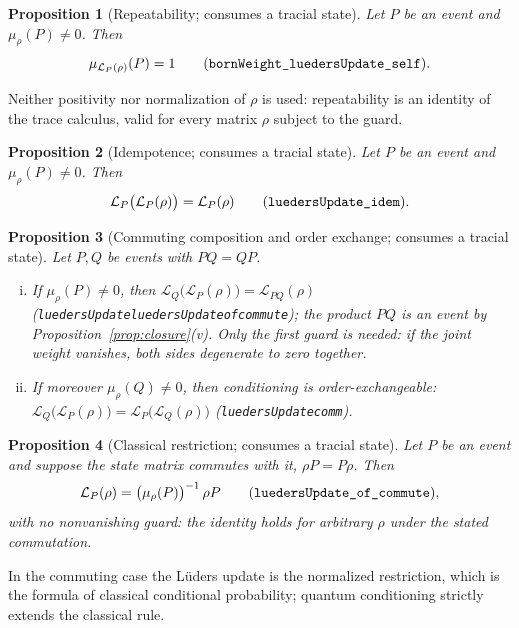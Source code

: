 \documentclass[11pt]{article}
\renewcommand{\_}{\textunderscore\allowbreak}
\newtheorem{proposition}{Proposition}
\theoremstyle{remark}
\newcommand{\lued}{\mathcal L}
\begin{document}
\begin{proposition}[Repeatability; consumes a tracial state]
\label{prop:repeat}
Let $P$ be an event and $\mu_\rho(P) \neq 0$. Then
\[
\mu_{\lued_P(\rho)}(P) = 1
\qquad (\texttt{bornWeight\_luedersUpdate\_self}).
\]
\end{proposition}

Neither positivity nor normalization of $\rho$ is used: repeatability is an identity of the trace calculus, valid for every matrix $\rho$ subject to the guard.

\begin{proposition}[Idempotence; consumes a tracial state]
\label{prop:idem}
Let $P$ be an event and $\mu_\rho(P) \neq 0$. Then
\[
\lued_P\bigl(\lued_P(\rho)\bigr) = \lued_P(\rho)
\qquad (\texttt{luedersUpdate\_idem}).
\]
\end{proposition}

\begin{proposition}[Commuting composition and order exchange; consumes a tracial state]
\label{prop:compose}
Let $P, Q$ be events with $PQ = QP$.
\begin{enumerate}[(i)]
\item If $\mu_\rho(P) \neq 0$, then $\lued_Q\bigl(\lued_P(\rho)\bigr) = \lued_{PQ}(\rho)$ (\texttt{luedersUpdate\_luedersUpdate\_of\_commute}); the product $PQ$ is an event by Proposition~\ref{prop:closure}(v). Only the first guard is needed: if the joint weight vanishes, both sides degenerate to zero together.
\item If moreover $\mu_\rho(Q) \neq 0$, then conditioning is order-exchangeable: $\lued_Q\bigl(\lued_P(\rho)\bigr) = \lued_P\bigl(\lued_Q(\rho)\bigr)$ (\texttt{luedersUpdate\_comm}).
\end{enumerate}
\end{proposition}

\begin{proposition}[Classical restriction; consumes a tracial state]
\label{prop:classical}
Let $P$ be an event and suppose the state matrix commutes with it, $\rho P = P \rho$. Then
\[
\lued_P(\rho) = \bigl(\mu_\rho(P)\bigr)^{-1}\, \rho P
\qquad (\texttt{luedersUpdate\_of\_commute}),
\]
with no nonvanishing guard: the identity holds for arbitrary $\rho$ under the stated commutation.
\end{proposition}

In the commuting case the L\"uders update is the normalized restriction, which is the formula of classical conditional probability; quantum conditioning strictly extends the classical rule.
\end{document}
